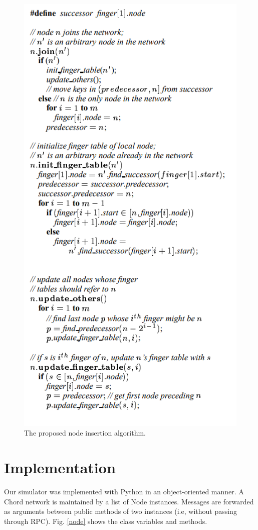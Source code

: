 \documentclass{article}
\begin{document}
\begin{figure}[H]
\centering
\includegraphics[scale=1.5]{alg_insert.PNG}
\caption{The proposed node insertion algorithm.
\label{alg.insert}}
\end{figure}


\section*{Implementation}
Our simulator was implemented with Python in an object-oriented manner. A Chord network is maintained by a list of Node instances. Messages are forwarded as arguments between public methods of two instances (i.e, without passing through RPC). Fig. \ref{node} shows the class variables and methods. 
\end{document}

